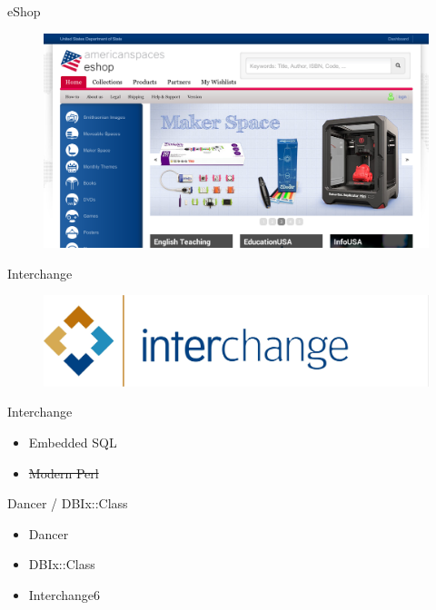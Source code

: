 \begin{frame}{eShop}
\begin{figure}[!ht]
\centering
\includegraphics[width=1\linewidth]{img/eshop.png}
\end{figure}
\end{frame}

\begin{frame}{Interchange}
\begin{figure}[!ht]
\centering
\includegraphics[width=1\linewidth]{img/interchange.jpg}
\end{figure}
\end{frame}

\begin{frame}{Interchange}
\begin{itemize}
\item Embedded SQL
\item \sout{Modern Perl}
\end{itemize}
\end{frame}

\begin{frame}{Dancer / DBIx::Class}
\begin{itemize}
\item Dancer
\item DBIx::Class
\item Interchange6
\end{itemize}
\end{frame}


